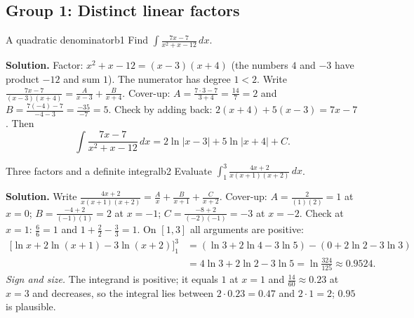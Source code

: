 \documentclass[11pt]{article}
\begin{document}
\subsection*{Group 1: Distinct linear factors}

\begin{exmp}{A quadratic denominator}{b1}
Find $\displaystyle\int\frac{7x-7}{x^2+x-12}\,dx$.

\textbf{Solution.} Factor: $x^2+x-12=(x-3)(x+4)$ (the numbers $4$ and $-3$ have product $-12$ and sum $1$). The numerator has degree $1<2$. Write $\frac{7x-7}{(x-3)(x+4)}=\frac A{x-3}+\frac B{x+4}$. Cover-up: $A=\frac{7\cdot3-7}{3+4}=\frac{14}7=2$ and $B=\frac{7(-4)-7}{-4-3}=\frac{-35}{-7}=5$. Check by adding back: $2(x+4)+5(x-3)=7x-7$. Then
\[\int\frac{7x-7}{x^2+x-12}\,dx=2\ln\lvert x-3\rvert+5\ln\lvert x+4\rvert+C .\]
\end{exmp}

\begin{exmp}{Three factors and a definite integral}{b2}
Evaluate $\displaystyle\int_1^3\frac{4x+2}{x(x+1)(x+2)}\,dx$.

\textbf{Solution.} Write $\frac{4x+2}{x(x+1)(x+2)}=\frac Ax+\frac B{x+1}+\frac C{x+2}$. Cover-up: $A=\frac{2}{(1)(2)}=1$ at $x=0$; $B=\frac{-4+2}{(-1)(1)}=2$ at $x=-1$; $C=\frac{-8+2}{(-2)(-1)}=-3$ at $x=-2$. Check at $x=1$: $\frac66=1$ and $1+\frac22-\frac33=1$. On $[1,3]$ all arguments are positive:
\begin{align*}\Big[\ln x+2\ln(x+1)-3\ln(x+2)\Big]_1^3&=(\ln3+2\ln4-3\ln5)-(0+2\ln2-3\ln3)\\&=4\ln3+2\ln2-3\ln5=\ln\frac{324}{125}\approx0.9524 .\end{align*}
\emph{Sign and size.} The integrand is positive; it equals $1$ at $x=1$ and $\frac{14}{60}\approx0.23$ at $x=3$ and decreases, so the integral lies between $2\cdot0.23=0.47$ and $2\cdot1=2$; $0.95$ is plausible.
\end{exmp}
\end{document}
